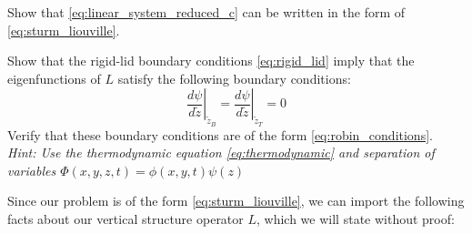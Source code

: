 \documentclass{article}
\numberwithin{equation}{section}
\newcommand{\z}{\tilde{z}}
\begin{document}
\begin{exerciseblock}
  \begin{problem}
  Show that \eqref{eq:linear_system_reduced_c} can be written in the form of \eqref{eq:sturm_liouville}. 
  \end{problem}
  \begin{problem}
  \label{ex:boundary_conditions_on_psi}
  \usedlater
  Show that the rigid-lid boundary conditions \eqref{eq:rigid_lid} imply that the eigenfunctions of $L$ satisfy the following boundary conditions:
  \begin{equation}
    \label{eq:boundary_conditions_on_psi}
    \left.\frac{d\psi}{d\z}\right|_{\z_B} = \left.\frac{d\psi}{d\z}\right|_{\z_T} = 0
  \end{equation}
  Verify that these boundary conditions are of the form \eqref{eq:robin_conditions}.
  \\\textit{Hint: Use the thermodynamic equation \eqref{eq:thermodynamic} and separation of variables $\Phi(x,y,z,t)=\phi(x,y,t)\psi(z)$}
  \end{problem}
\end{exerciseblock}
%
Since our problem is of the form \eqref{eq:sturm_liouville}, we can import the following facts about our vertical structure operator $L$, which we will state without proof:
%
\end{document}
